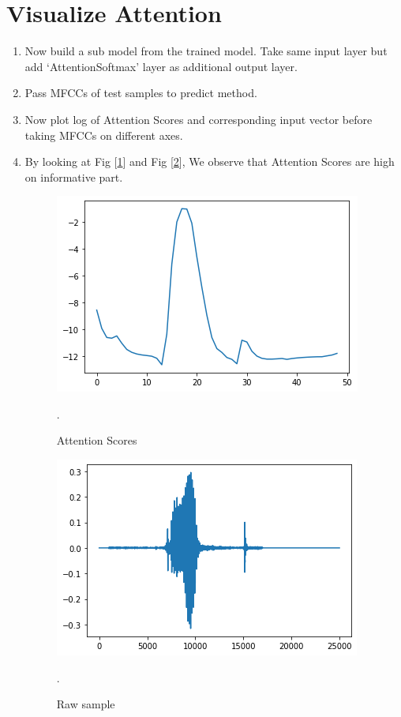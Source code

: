 \documentclass[11pt,english]{article}
\begin{document}
\section{Visualize Attention}
\begin{enumerate}
    \item Now build a sub model from the trained model. Take same input layer but add ‘AttentionSoftmax’ layer as additional output layer.
    \item Pass MFCCs of test samples to predict method.
    \item Now plot log of Attention Scores and corresponding input vector before taking MFCCs on different axes.
    \item By looking at Fig [\ref{fig: Attention}] and Fig [\ref{fig: Sample}], We observe that Attention Scores are high on informative part.
    \begin{figure}[!ht]
    \centering
    \includegraphics[width=\columnwidth]{./Figs/Attention.png}
    \caption{ Attention Scores}.
    \label{fig: Attention}	
    \end{figure}
    \begin{figure}[!ht]
    \centering
    \includegraphics[width=\columnwidth]{./Figs/Sample.png}
    \caption{ Raw sample}.
    \label{fig: Sample}	
    \end{figure}
    
\end{enumerate}
\end{document}
